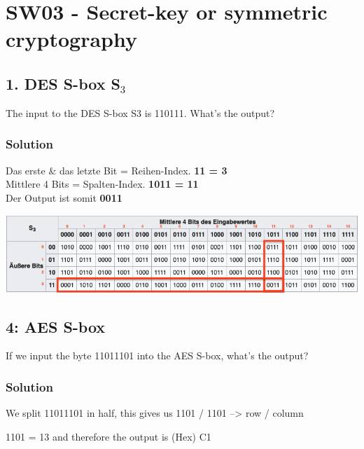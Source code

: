 \documentclass[11pt]{article}
\begin{document}
\newpage 

    \hypertarget{sw03---secret-key-or-symmetric-cryptography}{%
\section{SW03 - Secret-key or symmetric
cryptography}\label{sw03---secret-key-or-symmetric-cryptography}}

    \hypertarget{des-s-box-s_3}{%
\subsection{\texorpdfstring{1. DES S-box
S\(_{3}\)}{1: DES S-box S\_\{3\}}}\label{des-s-box-s_3}}

The input to the DES S-box S3 is 110111. What's the output?

\hypertarget{solution}{%
\subsubsection{Solution}\label{solution}}


Das erste \& das letzte Bit = Reihen-Index. \textbf{11 = 3 } \\
Mittlere 4 Bits = Spalten-Index.  \textbf{1011 = 11} \\
Der Output ist somit \textbf{0011}


\includegraphics[scale=0.9]{img/des_sbox.png}

    \hypertarget{aes-s-box}{%
\subsection{4: AES S-box}\label{aes-s-box}}

If we input the byte 11011101 into the AES S-box, what's the output?

\hypertarget{solution}{%
\subsubsection{Solution}\label{solution}}

We split 11011101 in half, this gives us 1101 / 1101 --\textgreater{}
row / column

1101 = 13 and therefore the output is  (Hex) C1
\end{document}
